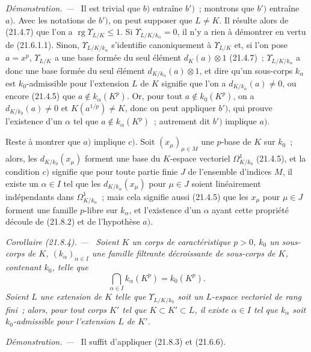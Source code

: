 \documentclass[10pt,oneside]{book}
\makeatletter
\newcommand{\setmanualcurrentlabel}[1]{\def\@currentlabel{#1}}
\newcommand{\oldpage}[2][]{%
  \setcounter{footnote}{0}%
  \marginpar{\scriptsize\textbf{#1}~|~#2}\ignorespaces}
\newenvironment{corollary}[1][]{%
  \setmanualcurrentlabel{#1}\par\medskip\noindent\itshape Corollaire (#1). ---\ }{\par}
\newenvironment{proof}{%
  \par\medskip\noindent\textit{Démonstration. ---\ }}{\par}
\makeatother
\begin{document}
\begin{proof}
Il est trivial que $b)$ entraîne $b')$~; montrons que $b')$ entraîne $a)$.
Avec les notations de $b')$, on peut supposer que $L\ne K$. Il résulte alors
de (21.4.7) que l'on a $\operatorname{rg}\Upsilon_{L/K}\leqslant1$. Si
$\Upsilon_{L/K/k_\alpha}=0$, il n'y a rien à démontrer en vertu de
(21.6.1.1). Sinon, $\Upsilon_{L/K/k_\alpha}$ s'identifie canoniquement à
$\Upsilon_{L/K}$ et, si l'on pose $a=x^p$, $\Upsilon_{L/K}$ a une base
formée du seul élément $d_K(a)\otimes1$ (21.4.7)~;
$\Upsilon_{L/K/k_\alpha}$ a donc une base formée du seul élément
$d_{K/k_\alpha}(a)\otimes1$, et dire qu'un sous-corps $k_\alpha$ est
$k_0$-admissible pour l'extension $L$ de $K$ signifie que l'on a
$d_{K/k_\alpha}(a)\ne0$, ou encore (21.4.5) que
$a\notin k_\alpha(K^p)$. Or, pour tout $a\notin k_0(K^p)$, on a
$d_{K/k_0}(a)\ne0$ et $K(a^{1/p})\ne K$, donc on peut appliquer $b')$, qui
prouve l'existence d'un $\alpha$ tel que $a\notin k_\alpha(K^p)$~;
autrement dit $b')$ implique $a)$.

Reste à montrer que $a)$ implique $c)$. Soit $(x_\mu)_{\mu\in M}$ une
$p$-base de $K$ sur $k_0$~; alors, les $d_{K/k_0}(x_\mu)$ forment une base du
$K$-espace vectoriel $\Omega^1_{K/k_0}$ (21.4.5), et la condition $c)$
signifie que pour toute partie finie $J$ de l'ensemble d'indices $M$, il
existe un $\alpha\in I$ tel que les $d_{K/k_\alpha}(x_\mu)$ pour $\mu\in J$
soient linéairement indépendants dans $\Omega^1_{K/k_\alpha}$~; mais cela
signifie aussi (21.4.5) que les $x_\mu$ pour $\mu\in J$ forment une famille
$p$-libre sur $k_\alpha$, et l'existence d'un $\alpha$ ayant cette propriété
découle de (21.8.2) et de l'hypothèse $a)$.
\end{proof}
\oldpage[0\textsubscript{IV-1}]{174}

\begin{corollary}[21.8.4]
\label{0.21.8.4-fr}
Soient $K$ un corps de caractéristique $p>0$, $k_0$ un sous-corps de $K$,
$(k_\alpha)_{\alpha\in I}$ une famille filtrante décroissante de sous-corps
de $K$, contenant $k_0$, telle que
\[
  \bigcap_{\alpha\in I}k_\alpha(K^p)=k_0(K^p).
\]
Soient $L$ une extension de $K$ telle que $\Upsilon_{L/K/k_0}$ soit un
$L$-espace vectoriel de rang fini~; alors, pour tout corps $K'$ tel que
$K\subset K'\subset L$, il existe $\alpha\in I$ tel que $k_\alpha$ soit
$k_0$-admissible pour l'extension $L$ de $K'$.
\end{corollary}

\begin{proof}
Il suffit d'appliquer (21.8.3) et (21.6.6).
\end{proof}
\end{document}
